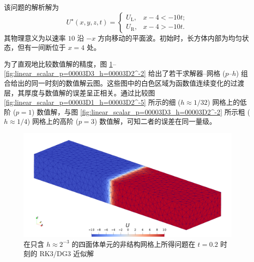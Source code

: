 该问题的解析解为
\begin{equation}
U^{\star}(x,y,z,t)=\begin{cases}
U_{\mathrm{L}}, & x-4<-10t;\\
U_{\mathrm{R}}, & x-4>-10t.
\end{cases}
\end{equation}
其物理意义为以速率 $10$ 沿 $-x$ 方向移动的平面波。初始时，长方体内部为均匀状态，但有一间断位于 $x=4$ 处。

为了直观地比较数值解的精度，图 \ref{fig:linear_scalar_p=00003D3_h=00003D2^-3}–\ref{fig:linear_scalar_p=00003D3_h=00003D2^-2}
给出了若干求解器–网格 ($p$–$h$) 组合给出的同一时刻的数值解云图。这些图中的白色区域为函数值连续变化的过渡层，其厚度与数值解的误差呈正相关。通过比较图
\ref{fig:linear_scalar_p=00003D1_h=00003D2^-5} 所示的细 ($h\approx1/32$)
网格上的低阶 ($p=1$) 数值解，与图 \ref{fig:linear_scalar_p=00003D3_h=00003D2^-2}
所示粗 ($h\approx1/4$) 网格上的高阶 ($p=3$) 数值解，可知二者的误差在同一量级。

\begin{figure}[h!]
\begin{centering}
\includegraphics[width=1\textwidth,height=0.4\textheight,keepaspectratio]{../mdpi/figures/linear_scalar/p=3_h=2^-3}
\par\end{centering}
\caption{\label{fig:linear_scalar_p=00003D3_h=00003D2^-3}在只含 $h\approx2^{-3}$
的四面体单元的非结构网格上所得问题在
$t=0.2$ 时刻的 RK3/DG3 近似解}
\end{figure}


